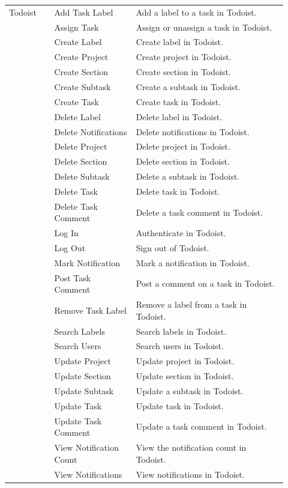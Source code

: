 \begin{longtable}{@{}p{0.15\linewidth}p{0.27\linewidth}p{0.50\linewidth}@{}}
\midrule
Todoist & Add Task Label & Add a label to a task in Todoist. \\
 & Assign Task & Assign or unassign a task in Todoist. \\
 & Create Label & Create label in Todoist. \\
 & Create Project & Create project in Todoist. \\
 & Create Section & Create section in Todoist. \\
 & Create Subtask & Create a subtask in Todoist. \\
 & Create Task & Create task in Todoist. \\
 & Delete Label & Delete label in Todoist. \\
 & Delete Notifications & Delete notifications in Todoist. \\
 & Delete Project & Delete project in Todoist. \\
 & Delete Section & Delete section in Todoist. \\
 & Delete Subtask & Delete a subtask in Todoist. \\
 & Delete Task & Delete task in Todoist. \\
 & Delete Task Comment & Delete a task comment in Todoist. \\
 & Log In & Authenticate in Todoist. \\
 & Log Out & Sign out of Todoist. \\
 & Mark Notification & Mark a notification in Todoist. \\
 & Post Task Comment & Post a comment on a task in Todoist. \\
 & Remove Task Label & Remove a label from a task in Todoist. \\
 & Search Labels & Search labels in Todoist. \\
 & Search Users & Search users in Todoist. \\
 & Update Project & Update project in Todoist. \\
 & Update Section & Update section in Todoist. \\
 & Update Subtask & Update a subtask in Todoist. \\
 & Update Task & Update task in Todoist. \\
 & Update Task Comment & Update a task comment in Todoist. \\
 & View Notification Count & View the notification count in Todoist. \\
 & View Notifications & View notifications in Todoist. \\

\end{longtable}
